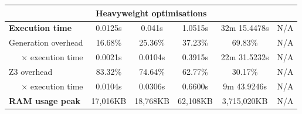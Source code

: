 \documentclass[english,runningheads]{llncs}
\begin{document}
\begin{table}[]
{\begin{tabular}{l||lllll}
\multicolumn{6}{c}{\textbf{Heavyweight optimisations}} \\ \hline \hline
\textbf{Execution time}                & \multicolumn{1}{c|}{0.0125s}  & \multicolumn{1}{c|}{0.041s}   & \multicolumn{1}{c|}{1.0515s}  & \multicolumn{1}{c|}{32m 15.4478s} & \multicolumn{1}{c}{\color[HTML]{888888} N/A} \\ \hline
Generation overhead                    & \multicolumn{1}{c|}{16.68\%}  & \multicolumn{1}{c|}{25.36\%}  & \multicolumn{1}{c|}{37.23\%}  & \multicolumn{1}{c|}{69.83\%}      & \multicolumn{1}{c}{\color[HTML]{888888} N/A} \\ \hline
\multicolumn{1}{r||}{× execution time} & \multicolumn{1}{c|}{0.0021s}  & \multicolumn{1}{c|}{0.0104s}  & \multicolumn{1}{c|}{0.3915s}  & \multicolumn{1}{c|}{22m 31.5232s} & \multicolumn{1}{c}{\color[HTML]{888888} N/A} \\ \hline
Z3 overhead                            & \multicolumn{1}{c|}{83.32\%}  & \multicolumn{1}{c|}{74.64\%}  & \multicolumn{1}{c|}{62.77\%}  & \multicolumn{1}{c|}{30.17\%}      & \multicolumn{1}{c}{\color[HTML]{888888} N/A} \\ \hline
\multicolumn{1}{r||}{× execution time} & \multicolumn{1}{c|}{0.0104s}  & \multicolumn{1}{c|}{0.0306s}  & \multicolumn{1}{c|}{0.6600s}  & \multicolumn{1}{c|}{9m 43.9246s}  & \multicolumn{1}{c}{\color[HTML]{888888} N/A} \\ \hline
\textbf{RAM usage peak}                & \multicolumn{1}{c|}{17,016KB} & \multicolumn{1}{c|}{18,768KB} & \multicolumn{1}{c|}{62,108KB} & \multicolumn{1}{c|}{3,715,020KB}  & \multicolumn{1}{c}{\color[HTML]{888888} N/A}
\end{tabular}
}
\end{table}
\end{document}
